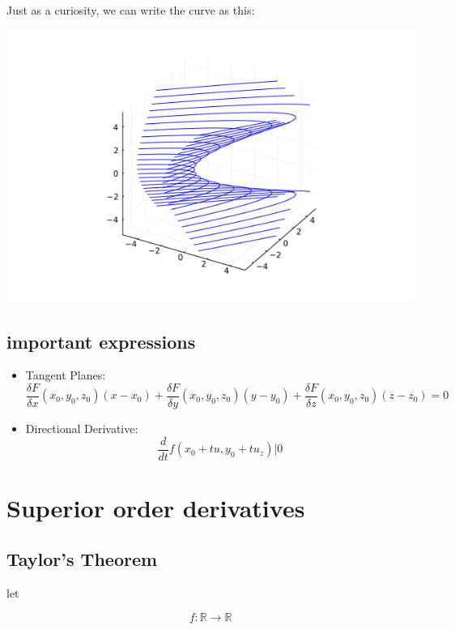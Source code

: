 \documentclass[11pt,fleqn]{book} %
\begin{document}
Just as a curiosity, we can write the curve as this:
\begin{center}
    \includegraphics[scale=0.5]{Pictures/473.png}
\end{center}

\section{important expressions}
\begin{itemize}
    \item Tangent Planes:
    \begin{equation}
        \frac{\delta F}{\delta x}(x_0,y_0,z_0)(x-x_0) + \frac{\delta F}{\delta y}(x_0,y_0,z_0)(y-y_0) + \frac{\delta F}{\delta z}(x_0,y_0,z_0)(z-z_0) = 0 
    \end{equation}
    \item Directional Derivative:
    \begin{equation}
        \frac{d}{dt}f(x_0+tu,y_0+tu_z) | 0
    \end{equation}
\end{itemize}


\chapter{Superior order derivatives}

\section{Taylor's Theorem}
let

$$ f: \mathbb{R} \to \mathbb{R} $$
\end{document}
